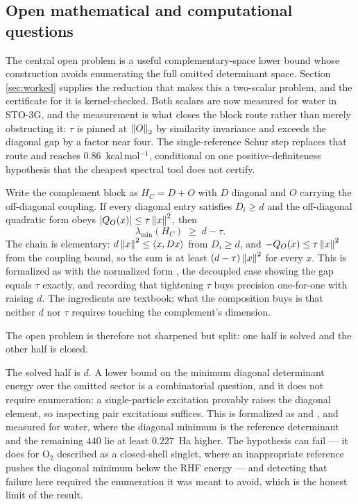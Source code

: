 \subsection{Open mathematical and computational questions}
The central open problem is a useful complementary-space lower bound whose
construction avoids enumerating the full omitted determinant space. Section
\ref{sec:worked} supplies the reduction that makes this a two-scalar problem, and
the certificate for it is kernel-checked. Both scalars are now measured for water
in STO-3G, and the measurement is what closes the block route rather than merely
obstructing it: $\tau$ is pinned at $\left\lVert O\right\rVert_2$ by similarity invariance and
exceeds the diagonal gap by a factor near four. The single-reference Schur step
replaces that route and reaches $0.86$~kcal\,mol$^{-1}$, conditional on one
positive-definiteness hypothesis that the cheapest spectral tool does not certify.

Write the complement block as $H_C = D + O$ with $D$ diagonal and $O$ carrying the
off-diagonal coupling. If every diagonal entry satisfies $D_i \ge d$ and the
off-diagonal quadratic form obeys $|Q_O(x)| \le \tau\left\lVert x\right\rVert^2$, then
\[
  \lambda_{\min}(H_C) \;\ge\; d - \tau .
\]
The chain is elementary: $d\left\lVert x\right\rVert^2 \le \left\langle x,Dx\right\rangle$ from $D_i \ge d$, and
$-Q_O(x) \le \tau\left\lVert x\right\rVert^2$ from the coupling bound, so the sum is at least
$(d-\tau)\left\lVert x\right\rVert^2$ for every $x$. This is formalized as
 with the normalized form
, the decoupled case
 showing the gap equals $\tau$ exactly,
and  recording that tightening $\tau$ buys
precision one-for-one with raising $d$. The ingredients are textbook; what the
composition buys is that neither $d$ nor $\tau$ requires touching the
complement's dimension.

The open problem is therefore not sharpened but split: one half is solved and the
other half is closed.

The solved half is $d$. A lower bound on the minimum diagonal determinant energy
over the omitted sector is a combinatorial question, and it does not require
enumeration: a single-particle excitation provably raises the diagonal element, so
inspecting pair excitations suffices. This is formalized as  and
, and measured for water, where the diagonal minimum is the
reference determinant and the remaining $440$ lie at least $0.227$~Ha higher. The
hypothesis can fail --- it does for O$_2$ described as a closed-shell singlet, where
an inappropriate reference pushes the diagonal minimum below the RHF energy --- and
detecting that failure here required the enumeration it was meant to avoid, which is
the honest limit of the result.

